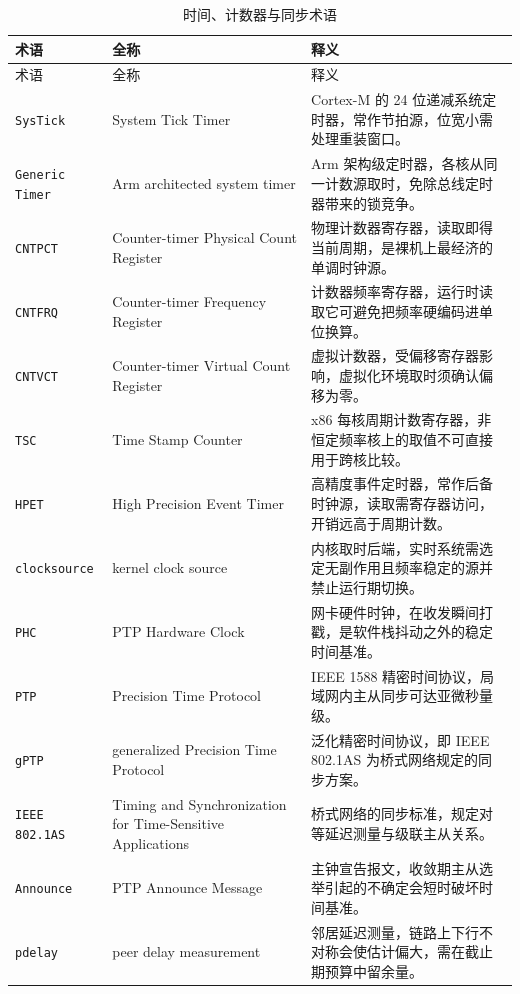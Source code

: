 \documentclass[12pt,a4paper,fontset=fandol]{ctexbook}
\newcommand{\Tp}[1]{\texttt{#1}}
\begin{document}
\begin{longtable}{@{} >{\raggedright\arraybackslash}p{} >{\raggedright\arraybackslash}p{} >{\raggedright\arraybackslash}p{}@{}}
\caption{时间、计数器与同步术语}\label{tab:apA-time} \\
\toprule
术语 & 全称 & 释义 \\
\midrule
\endfirsthead
\toprule
术语 & 全称 & 释义 \\
\midrule
\endhead
\bottomrule
\endfoot
\endlastfoot
\Tp{SysTick} & System Tick Timer & Cortex-M 的 24 位递减系统定时器，常作节拍源，位宽小需处理重装窗口。 \\
\Tp{Generic Timer} & Arm architected system timer & Arm 架构级定时器，各核从同一计数源取时，免除总线定时器带来的锁竞争。 \\
\Tp{CNTPCT} & Counter-timer Physical Count Register & 物理计数器寄存器，读取即得当前周期，是裸机上最经济的单调时钟源。 \\
\Tp{CNTFRQ} & Counter-timer Frequency Register & 计数器频率寄存器，运行时读取它可避免把频率硬编码进单位换算。 \\
\Tp{CNTVCT} & Counter-timer Virtual Count Register & 虚拟计数器，受偏移寄存器影响，虚拟化环境取时须确认偏移为零。 \\
\Tp{TSC} & Time Stamp Counter & x86 每核周期计数寄存器，非恒定频率核上的取值不可直接用于跨核比较。 \\
\Tp{HPET} & High Precision Event Timer & 高精度事件定时器，常作后备时钟源，读取需寄存器访问，开销远高于周期计数。 \\
\Tp{clocksource} & kernel clock source & 内核取时后端，实时系统需选定无副作用且频率稳定的源并禁止运行期切换。 \\
\Tp{PHC} & PTP Hardware Clock & 网卡硬件时钟，在收发瞬间打戳，是软件栈抖动之外的稳定时间基准。 \\
\Tp{PTP} & Precision Time Protocol & IEEE 1588 精密时间协议，局域网内主从同步可达亚微秒量级。 \\
\Tp{gPTP} & generalized Precision Time Protocol & 泛化精密时间协议，即 IEEE 802.1AS 为桥式网络规定的同步方案。 \\
\Tp{IEEE 802.1AS} & Timing and Synchronization for Time-Sensitive Applications & 桥式网络的同步标准，规定对等延迟测量与级联主从关系。 \\
\Tp{Announce} & PTP Announce Message & 主钟宣告报文，收敛期主从选举引起的不确定会短时破坏时间基准。 \\
\Tp{pdelay} & peer delay measurement & 邻居延迟测量，链路上下行不对称会使估计偏大，需在截止期预算中留余量。 \\

\end{longtable}
\end{document}
